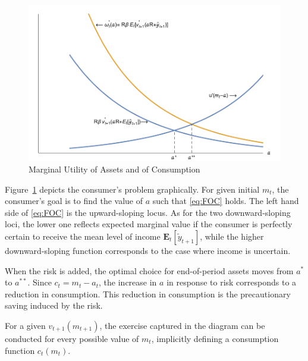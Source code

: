 \begin{figure}
\caption{Marginal Utility of Assets and of Consumption} \label{fig:EquateMargUtils}
\includegraphics[width=5.5in]{./Figures/EquateMargUtils}
\end{figure}

Figure~\ref{fig:EquateMargUtils} depicts the consumer's problem
graphically.  For given initial ${m}_{t}$, the consumer's goal is to
find the value of $a$ such that \eqref{eq:FOC} holds.  The left hand
side of \eqref{eq:FOC} is the upward-sloping locus.  As for the two
downward-sloping loci, the lower one reflects expected marginal value
if the consumer is perfectly certain to receive the mean level of
income $\mathbf{E}_{t}[\tilde{y}_{t+1}]$, while the higher downward-sloping
function corresponds to the case where income is uncertain.

When the risk is added, the optimal choice for end-of-period assets
moves from ${a}^{*}$ to ${a}^{**}$. Since $c_{t} = m_{t}-a_{t}$, the
increase in $a$ in response to risk corresponds to a reduction in
consumption. This reduction in consumption is the precautionary saving
induced by the risk.

For a given ${v}_{t+1}({m}_{t+1})$, the exercise captured in the
diagram can be conducted for every possible value of $m_{t}$,
implicitly defining a consumption function $c_{t}(m_{t})$.

